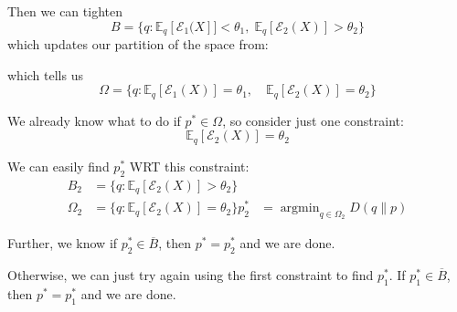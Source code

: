 \documentclass[12pt]{article}
\newcommand{\E}{\mathbb{E}}
\newcommand{\Ec}{\mathcal{E}}
\renewcommand{\bar}[1]{\overline{#1}}
\DeclareMathOperator*{\argmin}{\arg\min}
\begin{document}
Then we can tighten
\[B = \{q: \E_q[\Ec_1(X]]< \theta_1, \; \E_q[\Ec_2(X)] > \theta_2\}\]
which updates our partition of the space from:

\begin{center}
    \hspace{1cm}
    \hspace{1cm}
\end{center}
which tells us
\[\Omega = \{q: \E_q[\Ec_1(X)] = \theta_1, \quad \E_q[\Ec_2(X)] = \theta_2\} \]

We already know what to do if $p^* \in \Omega$, so consider just one constraint:
\[\E_q[\Ec_2(X)] = \theta_2\]

We can easily find $p_2^*$ WRT this constraint:
\begin{align*}
    B_2      & = \{q: \E_q[\Ec_2(X)] > \theta_2\}          \\
    \Omega_2 & = \{q: \E_q[\Ec_2(X)] = \theta_2\}
    p_2^*    & = \argmin_{q \in \Omega_2} D(q \parallel p)
\end{align*}

Further, we know if $p_2^* \in \bar B$, then $p^* = p_2^*$ and we are done.

Otherwise, we can just try again using the first constraint to find $p_1^*$. If $p_1^* \in \bar B$, then $p^* = p_1^*$ and we are done.
\end{document}
